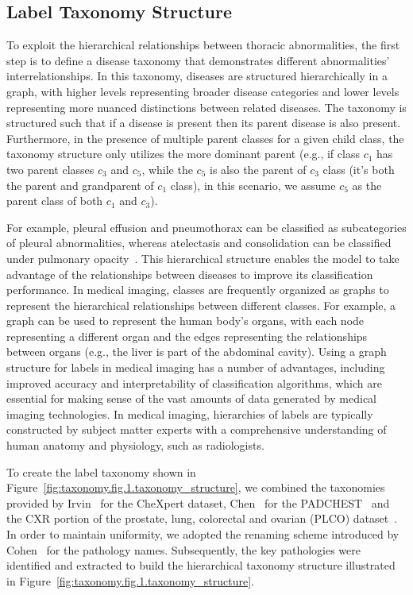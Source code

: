 \documentclass[review,1p,times,numbers]{elsarticle}
\begin{document}
\subsection{Label Taxonomy Structure}\label{subsec:label-taxonomy-and-hierarchy}
To exploit the hierarchical relationships between thoracic abnormalities, the first step is to define a disease taxonomy that demonstrates different abnormalities' interrelationships. In this taxonomy, diseases are structured hierarchically in a graph, with higher levels representing broader disease categories and lower levels representing more nuanced distinctions between related diseases. The taxonomy is structured such that if a disease is present then its parent disease is also present. Furthermore, in the presence of multiple parent classes for a given child class, the taxonomy structure only utilizes the more dominant parent (e.g., if class $c_1$ has two parent classes $c_3$ and $c_5$, while the $c_5$ is also the parent of $c_3$ class (it's both the parent and grandparent of $c_1$ class), in this scenario, we assume $c_5$ as the parent class of both $c_1$ and $c_3$).

For example, pleural effusion and pneumothorax can be classified as subcategories of pleural abnormalities, whereas atelectasis and consolidation can be classified under pulmonary opacity~\cite{irvin_CheXpert_2019}. This hierarchical structure enables the model to take advantage of the relationships between diseases to improve its classification performance.
In medical imaging, classes are frequently organized as graphs to represent the hierarchical relationships between different classes. For example, a graph can be used to represent the human body's organs, with each node representing a different organ and the edges representing the relationships between organs (e.g., the liver is part of the abdominal cavity). Using a graph structure for labels in medical imaging has a number of advantages, including improved accuracy and interpretability of classification algorithms, which are essential for making sense of the vast amounts of data generated by medical imaging technologies. In medical imaging, hierarchies of labels are typically constructed by subject matter experts with a comprehensive understanding of human anatomy and physiology, such as radiologists.

To create the label taxonomy shown in Figure~\ref{fig:taxonomy.fig.1.taxonomy_structure}, we combined the taxonomies provided by Irvin~\cite{irvin_CheXpert_2019} for the CheXpert dataset, Chen~\cite{chen_Deep_2020} for the PADCHEST~\cite{bustos_Padchest_2020} and the CXR portion of the prostate, lung, colorectal and ovarian (PLCO) dataset~\cite{gohagan_Prostate_2000}.
In order to maintain uniformity, we adopted the renaming scheme introduced by Cohen~\cite{cohen_TorchXRayVision_2022} for the pathology names. Subsequently, the key pathologies were identified and extracted to build the hierarchical taxonomy structure illustrated in Figure~\ref{fig:taxonomy.fig.1.taxonomy_structure}.
\end{document}

